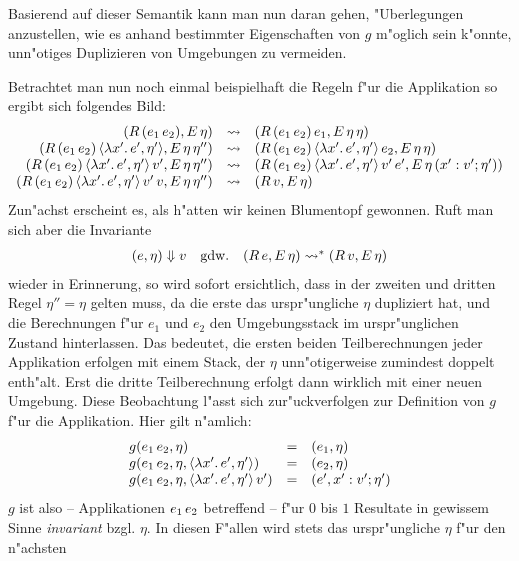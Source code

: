\documentclass[12pt,a4paper]{article}
\begin{document}
Basierend auf dieser Semantik kann man nun daran gehen, "Uberlegungen anzustellen, wie es anhand 
bestimmter Eigenschaften von $g$ m"oglich sein k"onnte, unn"otiges Duplizieren von Umgebungen zu
vermeiden.

Betrachtet man nun noch einmal beispielhaft die Regeln f"ur die Applikation so ergibt sich folgendes
Bild:
\[\begin{array}{rcl}
  (R\,({e_1}\,{e_2}),E\,\eta)
  &\rightsquigarrow& (R\,({e_1}\,{e_2})\,e_1,E\,\eta\,\eta) \\
  (R\,({e_1}\,{e_2})\,\langle{\lambda{x'}.\,{e'}},{\eta'}\rangle,E\,\eta\,\eta'')
  &\rightsquigarrow& (R\,({e_1}\,{e_2})\,\langle{\lambda{x'}.\,{e'}},{\eta'}\rangle\,e_2,E\,\eta\,\eta) \\
  (R\,({e_1}\,{e_2})\,\langle{\lambda{x'}.\,{e'}},{\eta'}\rangle\,v',E\,\eta\,\eta'')
  &\rightsquigarrow& (R\,({e_1}\,{e_2})\,\langle{\lambda{x'}.\,{e'}},{\eta'}\rangle\,v'\,e',E\,\eta\,(x':v';\eta')) \\
  (R\,({e_1}\,{e_2})\,\langle{\lambda{x'}.\,{e'}},{\eta'}\rangle\,v'\,v,E\,\eta\,\eta'')
  &\rightsquigarrow& (R\,v,E\,\eta) \\
\end{array}\]
Zun"achst erscheint es, als h"atten wir keinen Blumentopf gewonnen. Ruft man sich aber die Invariante
\[\begin{array}{rcl}
  (e,\eta) \Downarrow v & \text{gdw.} & (R\,e,E\,\eta) \rightsquigarrow^* (R\,v,E\,\eta)
\end{array}\]
wieder in Erinnerung, so wird sofort ersichtlich, dass in der zweiten und dritten Regel $\eta'' = \eta$
gelten muss, da die erste das urspr"ungliche $\eta$ dupliziert hat, und die Berechnungen f"ur $e_1$ und
$e_2$ den Umgebungsstack im urspr"unglichen Zustand hinterlassen. Das bedeutet, die ersten beiden
Teilberechnungen jeder Applikation erfolgen mit einem Stack, der $\eta$ unn"otigerweise zumindest
doppelt enth"alt. Erst die dritte Teilberechnung erfolgt dann wirklich mit einer neuen Umgebung.
Diese Beobachtung l"asst sich zur"uckverfolgen zur Definition von $g$ f"ur die Applikation. Hier gilt
n"amlich:
\[\begin{array}{lcl}
  g({e_1}\,{e_2},\eta) &=& (e_1,\eta) \\
  g({e_1}\,{e_2},\eta,\langle{\lambda{x'}.\,{e'}},{\eta'}\rangle) &=& (e_2,\eta) \\
  g({e_1}\,{e_2},\eta,\langle{\lambda{x'}.\,{e'}},{\eta'}\rangle\,v') &=& (e',x':v';\eta') \\
\end{array}\]
$g$ ist also -- Applikationen ${e_1}\,{e_2}$ betreffend -- f"ur $0$ bis $1$ Resultate in gewissem Sinne
\emph{invariant} bzgl. $\eta$. In diesen F"allen wird stets das urspr"ungliche $\eta$ f"ur den n"achsten
\end{document}
